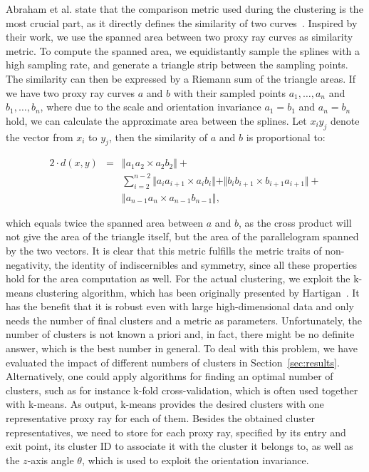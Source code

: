 \documentclass[journal]{vgtc}                %
\begin{document}
Abraham et al. state that the comparison metric used during the clustering is the most crucial part, as it directly defines the similarity of two curves~\cite{abraham03clustering}. Inspired by their work, we use the spanned area between two proxy ray curves as similarity metric. To compute the spanned area, we equidistantly sample the splines with a high sampling rate, and generate a triangle strip between the sampling points. The similarity can then be expressed by a Riemann sum of the triangle areas. If we have two proxy ray curves $a$ and $b$ with their sampled points $a_1,\dots,a_n$ and $b_1,\dots,b_n$, where due to the scale and orientation invariance $a_1=b_1$ and $a_n=b_n$ hold, we can calculate the approximate area between the splines. Let $x_iy_j$ denote the vector from $x_i$ to $y_j$, then the similarity of $a$ and $b$ is proportional to:

\begin{eqnarray*}
2\cdot d(x,y) &=& \Vert a_1a_2 \times a_2b_2\Vert + \\
&& \sum_{i=2}^{n-2}\Vert a_ia_{i+1} \times a_ib_i \Vert + \Vert b_ib_{i+1} \times b_{i+1}a_{i+1}\Vert + \\
&& \Vert a_{n-1}a_n \times a_{n-1}b_{n-1}\Vert,
\end{eqnarray*}

\noindent which equals twice the spanned area between $a$ and $b$, as the cross product will not give the area of the triangle itself, but the area of the parallelogram spanned by the two vectors. It is clear that this metric fulfills the metric traits of non-negativity, the identity of indiscernibles and symmetry, since all these properties hold for the area computation as well. For the actual clustering, we exploit the k-means clustering algorithm, which has been originally presented by Hartigan~\cite{hartigan75kmeans}. It has the benefit that it is robust even with large high-dimensional data and only needs the number of final clusters and a metric as parameters. Unfortunately, the number of clusters is not known a priori and, in fact, there might be no definite answer, which is the best number in general. To deal with this problem, we have evaluated the impact of different numbers of clusters in Section~\ref{sec:results}. Alternatively, one could apply algorithms for finding an optimal number of clusters, such as for instance k-fold cross-validation, which is often used together with k-means. As output, k-means provides the desired clusters with one representative proxy ray for each of them. Besides the obtained cluster representatives, we need to store for each proxy ray, specified by its entry and exit point, its cluster ID to associate it with the cluster it belongs to, as well as the $z$-axis angle $\theta$, which is used to exploit the orientation invariance.
\end{document}
